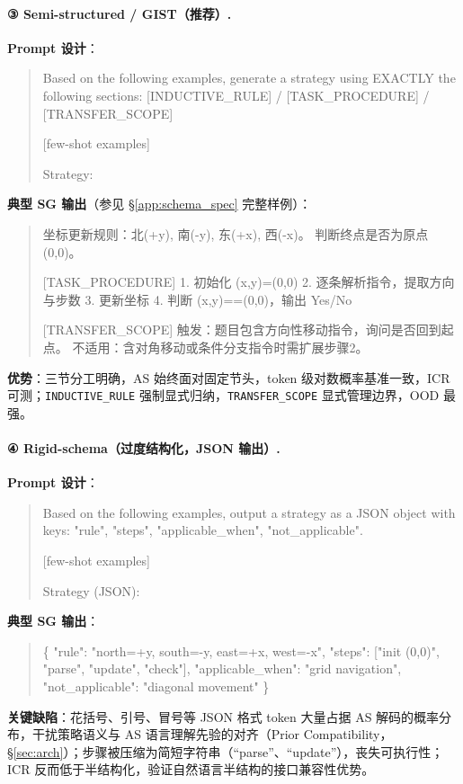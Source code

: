 \documentclass[11pt]{article}
\newcommand{\gist}{\textbf{GIST}}
\newcommand{\mist}{\textbf{GIST}}  %
\newcommand{\sg}{\textnormal{\textsc{SG}}}
\newcommand{\as}{\textnormal{\textsc{AS}}}
\begin{document}
\paragraph{③ Semi-structured / \mist{}（推荐）.}
\textbf{Prompt 设计}：
\begin{quote}\small\ttfamily
Based on the following examples, generate a strategy
using EXACTLY the following sections:
[INDUCTIVE\_RULE] / [TASK\_PROCEDURE] / [TRANSFER\_SCOPE]

[few-shot examples]

Strategy:
\end{quote}
\noindent\textbf{典型 \sg{} 输出}（参见 §\ref{app:schema_spec} 完整样例）：
\begin{quote}\small{}
坐标更新规则：北(+y), 南(-y), 东(+x), 西(-x)。
判断终点是否为原点(0,0)。

[TASK\_PROCEDURE]
1. 初始化 (x,y)=(0,0)
2. 逐条解析指令，提取方向与步数
3. 更新坐标
4. 判断 (x,y)==(0,0)，输出 Yes/No

[TRANSFER\_SCOPE]
触发：题目包含方向性移动指令，询问是否回到起点。
不适用：含对角移动或条件分支指令时需扩展步骤2。
\end{quote}
\noindent\textbf{优势}：三节分工明确，\as{} 始终面对固定节头，token 级对数概率基准一致，ICR 可测；\texttt{INDUCTIVE\_RULE} 强制显式归纳，\texttt{TRANSFER\_SCOPE} 显式管理边界，OOD 最强。

\paragraph{④ Rigid-schema（过度结构化，JSON 输出）.}
\textbf{Prompt 设计}：
\begin{quote}\small\ttfamily
Based on the following examples, output a strategy
as a JSON object with keys: "rule", "steps",
"applicable\_when", "not\_applicable".

[few-shot examples]

Strategy (JSON):
\end{quote}
\noindent\textbf{典型 \sg{} 输出}：
\begin{quote}\small\ttfamily
\{
  "rule": "north=+y, south=-y, east=+x, west=-x",
  "steps": ["init (0,0)", "parse", "update", "check"],
  "applicable\_when": "grid navigation",
  "not\_applicable": "diagonal movement"
\}
\end{quote}
\noindent\textbf{关键缺陷}：花括号、引号、冒号等 JSON 格式 token 大量占据 \as{} 解码的概率分布，干扰策略语义与 \as{} 语言理解先验的对齐（Prior Compatibility，§\ref{sec:arch}）；步骤被压缩为简短字符串（``parse''、``update''），丧失可执行性；ICR 反而低于半结构化，验证自然语言半结构的接口兼容性优势。
\end{document}
